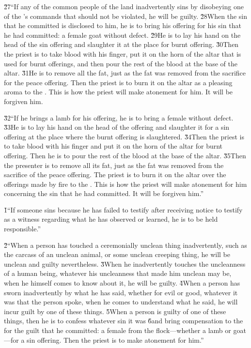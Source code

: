 \v{27}``If any of the common people of the land inadvertently sins by disobeying one of the 's commands that should not be violated, he will be guilty. \v{28}When the sin that he committed is disclosed to him, he is to bring his offering for his sin that he had committed: a female goat without defect. \v{29}He is to lay his hand on the head of the sin offering and slaughter it at the place for burnt offering. \v{30}Then the priest is to take blood with his finger, put it on the horn of the altar that is used for burnt offerings, and then pour the rest of the blood at the base of the altar. \v{31}He is to remove all the fat, just as the fat was removed from the sacrifice for the peace offering. Then the priest is to burn it on the altar as a pleasing aroma to the . This is how the priest will make atonement for him. It will be forgiven him.

\v{32}``If he brings a lamb for his offering, he is to bring a female without defect. \v{33}He is to lay his hand on the head of the offering and slaughter it for a sin offering at the place where the burnt offering is slaughtered. \v{34}Then the priest is to take blood with his finger and put it on the horn of the altar for burnt offering. Then he is to pour the rest of the blood at the base of the altar. \v{35}Then the presenter is to remove all its fat, just as the fat was removed from the sacrifice of the peace offering. The priest is to burn it on the altar over the offerings made by fire to the . This is how the priest will make atonement for him concerning the sin that he had committed. It will be forgiven him.''

\v{1}``If someone sins because he has failed to testify after receiving notice to testify as a witness regarding what he has observed or learned, he is to be held responsible.''

\v{2}``When a person has touched a ceremonially unclean thing inadvertently, such as the carcass of an unclean animal, or some unclean creeping thing, he will be unclean and guilty nevertheless. \v{3}When he inadvertently touches the uncleanness of a human being, whatever his uncleanness that made him unclean may be, when he himself comes to know about it, he will be guilty. \v{4}When a person has sworn inadvertently by what he has said, whether for evil or good, whatever it was that the person spoke, when he comes to understand what he said, he will incur guilt by one of these things. \v{5}When a person is guilty of one of these things, then he is to confess whatever sin it was \v{6}and bring compensation to the  for the guilt that he committed: a female from the flock---whether a lamb or goat---for a sin offering. Then the priest is to make atonement for him.''

